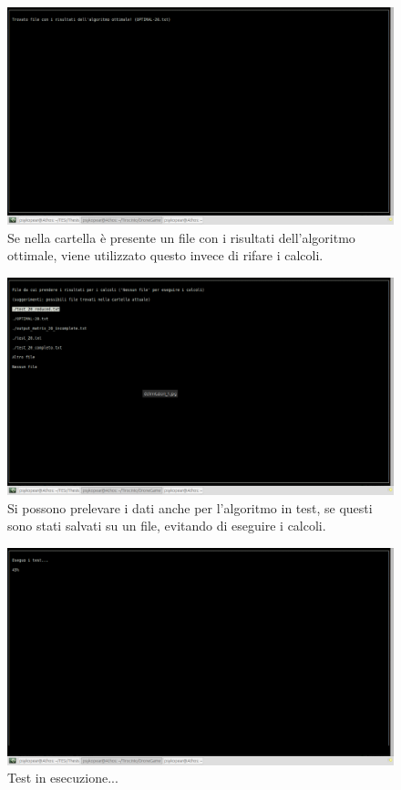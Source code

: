 \begin{figure}[hb]
\center
\includegraphics[width=\textwidth]{immagini/test2.png}
\caption{Se nella cartella è presente un file con i risultati dell'algoritmo ottimale, viene utilizzato questo invece di rifare i calcoli.}
\end{figure}

\begin{figure}[hb]
\center
\includegraphics[width=\textwidth]{immagini/test3.png}
\caption{Si possono prelevare i dati anche per l'algoritmo in test, se questi sono stati salvati su un file, evitando di eseguire i calcoli.}
\end{figure}

\begin{figure}[hb]
\center
\includegraphics[width=\textwidth]{immagini/test5.png}
\caption{Test in esecuzione...}
\end{figure}

